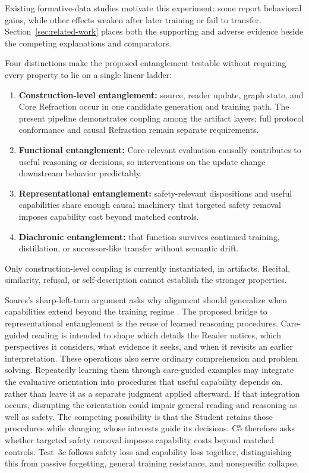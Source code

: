 \documentclass[11pt]{article}
\begin{document}
		Existing formative-data studies motivate this experiment: some report behavioral gains, while other effects weaken after later
training or fail to transfer. Section~\ref{sec:related-work} places both the
supporting and adverse evidence beside the competing explanations and
comparators.

		Four distinctions make the proposed entanglement testable without
requiring every property to lie on a single linear ladder:
		\begin{enumerate}
			\item \textbf{Construction-level entanglement:} source, reader update, graph state, and Core Refraction occur in one candidate generation and training path. The present pipeline demonstrates coupling among the artifact layers; full
protocol conformance and causal Refraction remain separate requirements.
			\item \textbf{Functional entanglement:} Core-relevant evaluation causally contributes to useful reasoning or decisions, so interventions on the update change downstream behavior predictably.
			\item \textbf{Representational entanglement:} safety-relevant dispositions and useful capabilities share enough causal machinery that targeted safety removal imposes capability cost beyond matched controls.
			\item \textbf{Diachronic entanglement:} that function survives continued training, distillation, or successor-like transfer without semantic drift.
		\end{enumerate}
		Only construction-level coupling is currently instantiated, in artifacts.
Recital, similarity, refusal, or self-description cannot establish the stronger
properties.

Soares's sharp-left-turn argument asks why alignment should generalize when
capabilities extend beyond the training regime \cite{soares2022sharp}.
The proposed bridge to representational entanglement is the reuse of learned
reasoning procedures. Care-guided reading is intended to shape which details
the Reader notices, which perspectives it considers, what evidence it seeks,
and when it revisits an earlier interpretation. These operations also serve
ordinary comprehension and problem solving. Repeatedly learning them through
care-guided examples may integrate the evaluative orientation into procedures
that useful capability depends on, rather than leave it as a separate judgment
applied afterward. If that integration occurs, disrupting the orientation
could impair general reading and reasoning as well as safety. The competing
possibility is that the Student retains those procedures while changing whose
interests guide its decisions. C5 therefore asks whether targeted safety
removal imposes capability costs beyond matched controls. Test~3c follows safety loss and
capability loss together, distinguishing this from passive forgetting, general
training resistance, and nonspecific collapse.
\end{document}

